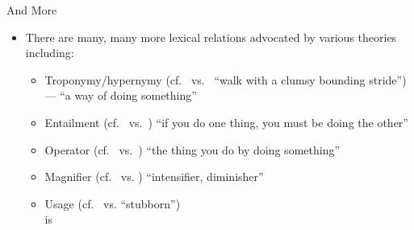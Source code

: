 \begin{frame}{And More}
\MyLogo{}
\begin{itemize}
\item There are many, many more lexical relations advocated by various
  theories including:
  \begin{itemize}
  \item Troponymy/hypernymy (cf.\  vs.\  ``walk with a clumsy bounding stride'')
    --- ``a way of doing something''
  \item Entailment (cf.\  vs.\ ) ``if you do one thing, you must be doing the other''
  \item Operator (cf.\  vs.\ )
    ``the thing you do by doing something''
  \item Magnifier (cf.\  vs. )
    ``intensifier, diminisher''
  \item Usage (cf.\  vs.  ``stubborn'')
    \\  is 
  \end{itemize}
\end{itemize}

\end{frame}

